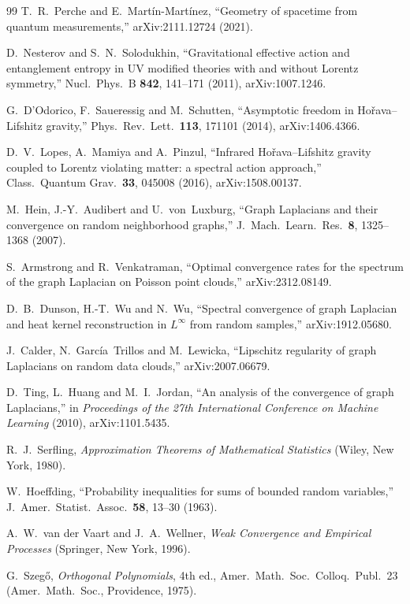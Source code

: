 \documentclass[11pt,a4paper]{article}
\theoremstyle{stmt}
\theoremstyle{defn}
\theoremstyle{rmk}
\numberwithin{equation}{section}
\begin{document}
{\begin{thebibliography}{99}
 T.~R.~Perche and E.~Mart\'in-Mart\'inez, ``Geometry of spacetime from quantum measurements,'' arXiv:2111.12724 (2021).

 D.~Nesterov and S.~N.~Solodukhin, ``Gravitational effective action and entanglement entropy in UV modified theories with and without Lorentz symmetry,'' Nucl.\ Phys.\ B \textbf{842}, 141--171 (2011), arXiv:1007.1246.

 G.~D'Odorico, F.~Saueressig and M.~Schutten, ``Asymptotic freedom in Ho\v{r}ava--Lifshitz gravity,'' Phys.\ Rev.\ Lett.\ \textbf{113}, 171101 (2014), arXiv:1406.4366.

 D.~V.~Lopes, A.~Mamiya and A.~Pinzul, ``Infrared Ho\v{r}ava--Lifshitz gravity coupled to Lorentz violating matter: a spectral action approach,'' Class.\ Quantum Grav.\ \textbf{33}, 045008 (2016), arXiv:1508.00137.

 M.~Hein, J.-Y.~Audibert and U.~von~Luxburg, ``Graph Laplacians and their convergence on random neighborhood graphs,'' J.\ Mach.\ Learn.\ Res.\ \textbf{8}, 1325--1368 (2007).

 S.~Armstrong and R.~Venkatraman, ``Optimal convergence rates for the spectrum of the graph Laplacian on Poisson point clouds,'' arXiv:2312.08149.

 D.~B.~Dunson, H.-T.~Wu and N.~Wu, ``Spectral convergence of graph Laplacian and heat kernel reconstruction in $L^\infty$ from random samples,'' arXiv:1912.05680.

 J.~Calder, N.~Garc\'ia~Trillos and M.~Lewicka, ``Lipschitz regularity of graph Laplacians on random data clouds,'' arXiv:2007.06679.

 D.~Ting, L.~Huang and M.~I.~Jordan, ``An analysis of the convergence of graph Laplacians,'' in \emph{Proceedings of the 27th International Conference on Machine Learning} (2010), arXiv:1101.5435.

 R.~J.~Serfling, \emph{Approximation Theorems of Mathematical Statistics} (Wiley, New York, 1980).

 W.~Hoeffding, ``Probability inequalities for sums of bounded random variables,'' J.\ Amer.\ Statist.\ Assoc.\ \textbf{58}, 13--30 (1963).

 A.~W.~van der Vaart and J.~A.~Wellner, \emph{Weak Convergence and Empirical Processes} (Springer, New York, 1996).

 G.~Szeg\H{o}, \emph{Orthogonal Polynomials}, 4th ed., Amer.\ Math.\ Soc.\ Colloq.\ Publ.\ 23 (Amer.\ Math.\ Soc., Providence, 1975).

\end{thebibliography}}
\end{document}
